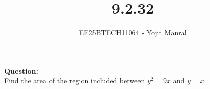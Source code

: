 \documentclass[journal]{IEEEtran}
\begin{document}

\vspace{3cm}

\title{9.2.32}
\author{EE25BTECH11064 - Yojit Manral}

\maketitle
{\let\newpage\relax\maketitle}
\renewcommand{\thefigure}{\theenumi}
\renewcommand{\thetable}{\theenumi}
\setlength{\intextsep}{10pt} %

\textbf{Question:}\\
Find the area of the region included between $y^2 = 9x$ and $y = x$.
\end{document}
